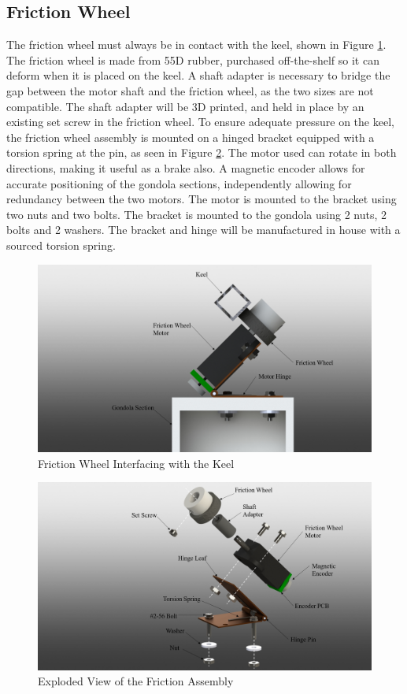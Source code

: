 \documentclass[../main.tex]{subfiles}
\begin{document}
\subsection{Friction Wheel}
The friction wheel must always be in contact with the keel, shown in Figure \ref{fig:frictionWheelOnGondola}. The friction wheel is made from 55D rubber, purchased off-the-shelf so it can deform when it is placed on the keel. A shaft adapter is necessary to bridge the gap between the motor shaft and the friction wheel, as the two sizes are not compatible. The shaft adapter will be 3D printed, and held in place by an existing set screw in the friction wheel. To ensure adequate pressure on the keel, the friction wheel assembly is mounted on a hinged bracket equipped with a torsion spring at the pin, as seen in Figure \ref{fig:explodedFrictionWheel}. The motor used can rotate in both directions, making it useful as a brake also. A magnetic encoder allows for accurate positioning of the gondola sections, independently allowing for redundancy between the two motors. The motor is mounted to the bracket using two nuts and two bolts. The bracket is mounted to the gondola using 2 nuts, 2 bolts and 2 washers. The bracket and hinge will be manufactured in house with a sourced torsion spring.
\\
\begin{figure}[H]
	\centering
	\includegraphics[width=.8\linewidth]{img/design/gondola/frictionWheelOnGondola.png}
	\caption{Friction Wheel Interfacing with the Keel}
		\label{fig:frictionWheelOnGondola}
\end{figure}
\begin{figure}[H]
	\centering
	\includegraphics[width=.8\linewidth]{img/design/gondola/explodedFrictionWheel.png}
	\caption{Exploded View of the Friction Assembly}
	\label{fig:explodedFrictionWheel}
\end{figure}
\end{document}
